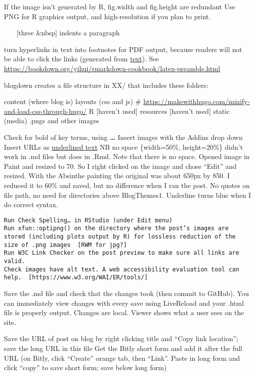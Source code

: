 \documentclass[
]{article}
\begin{document}
If the image isn't generated by R, fig.width and fig.height are
redundant Use PNG for R graphics output, and high-resolution if you plan
to print.

~~~ {[}three \&nbsp{]} indents a paragraph

turn hyperlinks in text into footnotes for PDF output, because readers
will not be able to click the links (generated from \href{URL}{text}).
See
\url{https://bookdown.org/yihui/rmarkdown-cookbook/latex-preamble.html}

blogdown creates a file structure in XX/ that includes these folders:

content (where blog is) layouts (css and js) \#
\url{https://makewithhugo.com/minify-and-load-css-through-hugo/} R
{[}haven't used{]} resources {[}haven't used{]} static (media) .pngs and
other images

Check for bold of key terms, using \textbf{\ldots{}} Insert images with
the Addins drop down Insert URLs as \href{URL}{underlined text} NB no
space \{width=50\%, height=20\%\} didn't work in .md files but does in
.Rmd. Note that there is no space. Opened image in Paint and resized to
70. So I right clicked on the image and chose ``Edit'' and resized. With
the Absinthe painting the original was about 650px by 850. I reduced it
to 60\% and saved, but no difference when I ran the post. No quotes on
file path, no need for directories above BlogThemes1. Underline turns
blue when I do correct syntax.

\begin{verbatim}
Run Check Spelling… in RStudio (under Edit menu)
Run xfun::optipng() on the directory where the post’s images are stored (including plots output by R) for lossless reduction of the size of .png images  [RWM for jpg?]
Run W3C Link Checker on the post preview to make sure all links are valid.
Check images have alt text. A web accessibility evaluation tool can help.  [https://www.w3.org/WAI/ER/tools/]
\end{verbatim}

Save the .md file and check that the changes took (then commit to
GitHub). You can immediately view changes with every save using
LiveReload and your .html file is properly output. Changes are local.
Viewer shows what a user sees on the site.

Save the URL of post on blog by right clicking title and ``Copy link
location''; save the long URL in this file Get the Bitly short form and
add it after the full URL (on Bitly, click ``Create'' orange tab, then
``Link''. Paste in long form and click ``copy'' to save short form; save
below long form)
\end{document}
